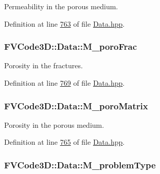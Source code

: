 Permeability in the porous medium. 



Definition at line \hyperlink{Data_8hpp_source_l00763}{763} of file \hyperlink{Data_8hpp_source}{Data.\+hpp}.

\subsubsection[{\texorpdfstring{M\+\_\+poro\+Frac}{M_poroFrac}}]{ F\+V\+Code3\+D\+::\+Data\+::\+M\+\_\+poro\+Frac\hspace{0.3cm}{\ttfamily [protected]}}\hypertarget{classFVCode3D_1_1Data_af95b239d77dd531aaa59e3ac891dbd71}{}\label{classFVCode3D_1_1Data_af95b239d77dd531aaa59e3ac891dbd71}


Porosity in the fractures. 



Definition at line \hyperlink{Data_8hpp_source_l00769}{769} of file \hyperlink{Data_8hpp_source}{Data.\+hpp}.

\subsubsection[{\texorpdfstring{M\+\_\+poro\+Matrix}{M_poroMatrix}}]{ F\+V\+Code3\+D\+::\+Data\+::\+M\+\_\+poro\+Matrix\hspace{0.3cm}{\ttfamily [protected]}}\hypertarget{classFVCode3D_1_1Data_ab4e2bcf1ebf986f6e5329b695707a73e}{}\label{classFVCode3D_1_1Data_ab4e2bcf1ebf986f6e5329b695707a73e}


Porosity in the porous medium. 



Definition at line \hyperlink{Data_8hpp_source_l00765}{765} of file \hyperlink{Data_8hpp_source}{Data.\+hpp}.

\subsubsection[{\texorpdfstring{M\+\_\+problem\+Type}{M_problemType}}]{ F\+V\+Code3\+D\+::\+Data\+::\+M\+\_\+problem\+Type\hspace{0.3cm}{\ttfamily [protected]}}\hypertarget{classFVCode3D_1_1Data_a7d31023f4e0ca0377503c0a74797c5b3}{}\label{classFVCode3D_1_1Data_a7d31023f4e0ca0377503c0a74797c5b3}


